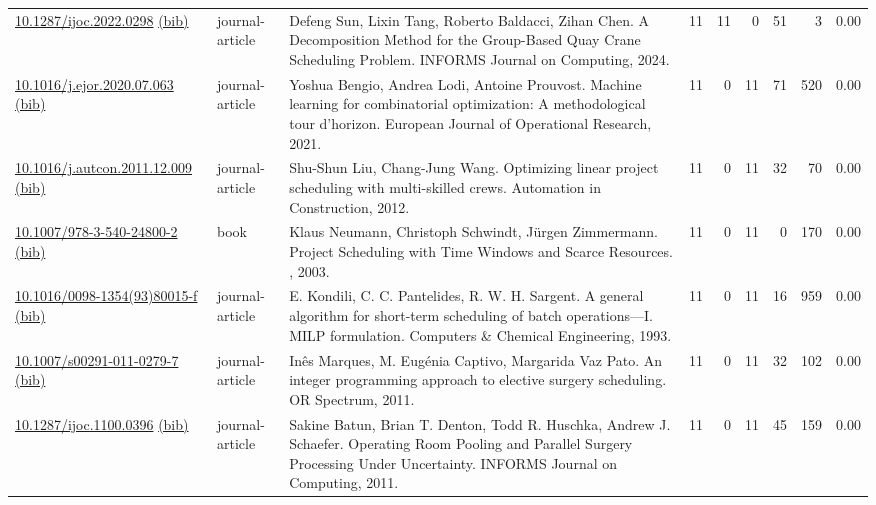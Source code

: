 {\begin{longtable}{p{5cm}lp{11cm}rrrrrr}
\href{http://dx.doi.org/10.1287/ijoc.2022.0298}{10.1287/ijoc.2022.0298} \href{https://www.doi2bib.org/bib/10.1287/ijoc.2022.0298}{(bib)} & journal-article & Defeng Sun, Lixin Tang, Roberto Baldacci, Zihan Chen. A Decomposition Method for the Group-Based Quay Crane Scheduling Problem. INFORMS Journal on Computing, 2024. & 11 & 11 & 0 & 51 & 3 &  0.00\\
\href{http://dx.doi.org/10.1016/j.ejor.2020.07.063}{10.1016/j.ejor.2020.07.063} \href{https://www.doi2bib.org/bib/10.1016/j.ejor.2020.07.063}{(bib)} & journal-article & Yoshua Bengio, Andrea Lodi, Antoine Prouvost. Machine learning for combinatorial optimization: A methodological tour d’horizon. European Journal of Operational Research, 2021. & 11 & 0 & 11 & 71 & 520 &  0.00\\
\href{http://dx.doi.org/10.1016/j.autcon.2011.12.009}{10.1016/j.autcon.2011.12.009} \href{https://www.doi2bib.org/bib/10.1016/j.autcon.2011.12.009}{(bib)} & journal-article & Shu-Shun Liu, Chang-Jung Wang. Optimizing linear project scheduling with multi-skilled crews. Automation in Construction, 2012. & 11 & 0 & 11 & 32 & 70 &  0.00\\
\href{http://dx.doi.org/10.1007/978-3-540-24800-2}{10.1007/978-3-540-24800-2} \href{https://www.doi2bib.org/bib/10.1007/978-3-540-24800-2}{(bib)} & book & Klaus Neumann, Christoph Schwindt, Jürgen Zimmermann. Project Scheduling with Time Windows and Scarce Resources. , 2003. & 11 & 0 & 11 & 0 & 170 &  0.00\\
\href{http://dx.doi.org/10.1016/0098-1354(93)80015-f}{10.1016/0098-1354(93)80015-f} \href{https://www.doi2bib.org/bib/10.1016/0098-1354(93)80015-f}{(bib)} & journal-article & E. Kondili, C. C. Pantelides, R. W. H. Sargent. A general algorithm for short-term scheduling of batch operations—I. MILP formulation. Computers \& Chemical Engineering, 1993. & 11 & 0 & 11 & 16 & 959 &  0.00\\
\href{http://dx.doi.org/10.1007/s00291-011-0279-7}{10.1007/s00291-011-0279-7} \href{https://www.doi2bib.org/bib/10.1007/s00291-011-0279-7}{(bib)} & journal-article & Inês Marques, M. Eugénia Captivo, Margarida Vaz Pato. An integer programming approach to elective surgery scheduling. OR Spectrum, 2011. & 11 & 0 & 11 & 32 & 102 &  0.00\\
\href{http://dx.doi.org/10.1287/ijoc.1100.0396}{10.1287/ijoc.1100.0396} \href{https://www.doi2bib.org/bib/10.1287/ijoc.1100.0396}{(bib)} & journal-article & Sakine Batun, Brian T. Denton, Todd R. Huschka, Andrew J. Schaefer. Operating Room Pooling and Parallel Surgery Processing Under Uncertainty. INFORMS Journal on Computing, 2011. & 11 & 0 & 11 & 45 & 159 &  0.00\\
\end{longtable}
}

